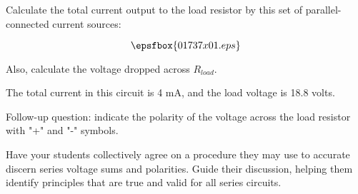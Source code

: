 

Calculate the total current output to the load resistor by this set of parallel-connected current sources:

$$\epsfbox{01737x01.eps}$$

Also, calculate the voltage dropped across $R_{load}$.







The total current in this circuit is 4 mA, and the load voltage is 18.8 volts.

\vskip 10pt

Follow-up question: indicate the polarity of the voltage across the load resistor with "+" and "-" symbols.







Have your students collectively agree on a procedure they may use to accurate discern series voltage sums and polarities.  Guide their discussion, helping them identify principles that are true and valid for all series circuits.




